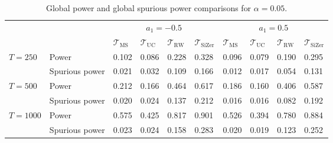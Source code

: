 \begin{table}[t!]
\footnotesize{
\caption{Global power and global spurious power comparisons for $\alpha=0.05$.}\label{tab:sim:power:bump}
\begin{tabularx}{\textwidth}{l@{\hskip 15pt} l@{\hskip 15pt} Z@{\hskip 6pt}Z@{\hskip 6pt}Z@{\hskip 6pt}Z@{\hskip 15pt}Z@{\hskip 6pt}Z@{\hskip 6pt}Z@{\hskip 6pt}Z}
\toprule
 & &  &  \\
 & & $\mathcal{T}_{\text{MS}}$ & $\mathcal{T}_{\text{UC}}$ & $\mathcal{T}_{\text{RW}}$ & $\mathcal{T}_{\text{SiZer}}$ & $\mathcal{T}_{\text{MS}}$ & $\mathcal{T}_{\text{UC}}$ & $\mathcal{T}_{\text{RW}}$ & $\mathcal{T}_{\text{SiZer}}$ \\
$T=250$  & Power           & 0.102 & 0.086 & 0.228 & 0.328 &  0.096 & 0.079 & 0.190 & 0.295 \\ 
         & Spurious power  & 0.021 & 0.032 & 0.109 & 0.166 &  0.012 & 0.017 & 0.054 & 0.131 \\[0.05cm] 
$T=500$  & Power           & 0.212 & 0.166 & 0.464 & 0.617 &  0.186 & 0.160 & 0.406 & 0.587 \\ 
         & Spurious power  & 0.020 & 0.024 & 0.137 & 0.212 &  0.016 & 0.016 & 0.082 & 0.192 \\[0.05cm] 
$T=1000$ & Power           & 0.575 & 0.425 & 0.817 & 0.901 &  0.526 & 0.394 & 0.780 & 0.884 \\ 
         & Spurious power  & 0.023 & 0.024 & 0.158 & 0.283 &  0.020 & 0.019 & 0.123 & 0.252 \\ 
\bottomrule
\end{tabularx}}
\vspace{0.2cm}
\end{table}


